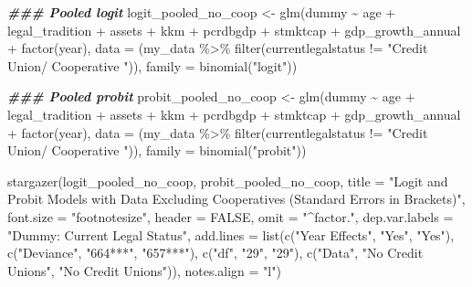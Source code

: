 \documentclass[a4paper,nobind]{templates/ociamthesis}
\newenvironment{Shaded}{\begin{snugshade}}{\end{snugshade}}
\newcommand{\AttributeTok}[1]{\textcolor[rgb]{0.77,0.63,0.00}{#1}}
\newcommand{\ConstantTok}[1]{\textcolor[rgb]{0.00,0.00,0.00}{#1}}
\newcommand{\DocumentationTok}[1]{\textcolor[rgb]{0.56,0.35,0.01}{\textbf{\textit{#1}}}}
\newcommand{\FunctionTok}[1]{\textcolor[rgb]{0.00,0.00,0.00}{#1}}
\newcommand{\NormalTok}[1]{#1}
\newcommand{\OtherTok}[1]{\textcolor[rgb]{0.56,0.35,0.01}{#1}}
\newcommand{\SpecialCharTok}[1]{\textcolor[rgb]{0.00,0.00,0.00}{#1}}
\newcommand{\StringTok}[1]{\textcolor[rgb]{0.31,0.60,0.02}{#1}}
\renewenvironment{Shaded}
{
  \vspace{10pt}%
  \begin{snugshade}%
}{%
  \end{snugshade}%
  \vspace{8pt}%
}
\begin{document}
\begin{Shaded}
\begin{Highlighting}[]
\DocumentationTok{\#\#\# Pooled logit}
\NormalTok{logit\_pooled\_no\_coop }\OtherTok{\textless{}{-}} \FunctionTok{glm}\NormalTok{(dummy }\SpecialCharTok{\textasciitilde{}}\NormalTok{ age }\SpecialCharTok{+}\NormalTok{ legal\_tradition }\SpecialCharTok{+} 
\NormalTok{       assets }\SpecialCharTok{+}\NormalTok{ kkm }\SpecialCharTok{+} 
\NormalTok{       pcrdbgdp }\SpecialCharTok{+}\NormalTok{ stmktcap }\SpecialCharTok{+}\NormalTok{ gdp\_growth\_annual }\SpecialCharTok{+} \FunctionTok{factor}\NormalTok{(year), }
       \AttributeTok{data =}\NormalTok{ (my\_data }\SpecialCharTok{\%\textgreater{}\%} \FunctionTok{filter}\NormalTok{(currentlegalstatus }\SpecialCharTok{!=} \StringTok{"Credit Union/ Cooperative "}\NormalTok{)), }\AttributeTok{family =} \FunctionTok{binomial}\NormalTok{(}\StringTok{"logit"}\NormalTok{))}

\DocumentationTok{\#\#\# Pooled probit}
\NormalTok{probit\_pooled\_no\_coop }\OtherTok{\textless{}{-}} \FunctionTok{glm}\NormalTok{(dummy }\SpecialCharTok{\textasciitilde{}}\NormalTok{ age }\SpecialCharTok{+}\NormalTok{ legal\_tradition }\SpecialCharTok{+} 
\NormalTok{       assets }\SpecialCharTok{+}\NormalTok{ kkm }\SpecialCharTok{+} 
\NormalTok{       pcrdbgdp }\SpecialCharTok{+}\NormalTok{ stmktcap }\SpecialCharTok{+}\NormalTok{ gdp\_growth\_annual }\SpecialCharTok{+} \FunctionTok{factor}\NormalTok{(year), }
       \AttributeTok{data =}\NormalTok{ (my\_data }\SpecialCharTok{\%\textgreater{}\%} \FunctionTok{filter}\NormalTok{(currentlegalstatus }\SpecialCharTok{!=} \StringTok{"Credit Union/ Cooperative "}\NormalTok{)), }\AttributeTok{family =} \FunctionTok{binomial}\NormalTok{(}\StringTok{"probit"}\NormalTok{))}

\FunctionTok{stargazer}\NormalTok{(logit\_pooled\_no\_coop, probit\_pooled\_no\_coop, }\AttributeTok{title =} \StringTok{"Logit and Probit Models with Data Excluding Cooperatives (Standard Errors in Brackets)"}\NormalTok{, }\AttributeTok{font.size =} \StringTok{"footnotesize"}\NormalTok{, }\AttributeTok{header =} \ConstantTok{FALSE}\NormalTok{, }\AttributeTok{omit =} \StringTok{"\^{}factor."}\NormalTok{, }\AttributeTok{dep.var.labels =} \StringTok{"Dummy: Current Legal Status"}\NormalTok{, }\AttributeTok{add.lines =} \FunctionTok{list}\NormalTok{(}\FunctionTok{c}\NormalTok{(}\StringTok{"Year Effects"}\NormalTok{, }\StringTok{"Yes"}\NormalTok{, }\StringTok{"Yes"}\NormalTok{),                      }
\FunctionTok{c}\NormalTok{(}\StringTok{"Deviance"}\NormalTok{, }\StringTok{"664***"}\NormalTok{, }\StringTok{"657***"}\NormalTok{), }\FunctionTok{c}\NormalTok{(}\StringTok{"df"}\NormalTok{, }\StringTok{"29"}\NormalTok{, }\StringTok{"29"}\NormalTok{), }\FunctionTok{c}\NormalTok{(}\StringTok{"Data"}\NormalTok{, }\StringTok{"No Credit Unions"}\NormalTok{, }\StringTok{"No Credit Unions"}\NormalTok{)), }\AttributeTok{notes.align =} \StringTok{"l"}\NormalTok{)}
\end{Highlighting}
\end{Shaded}
\end{document}
